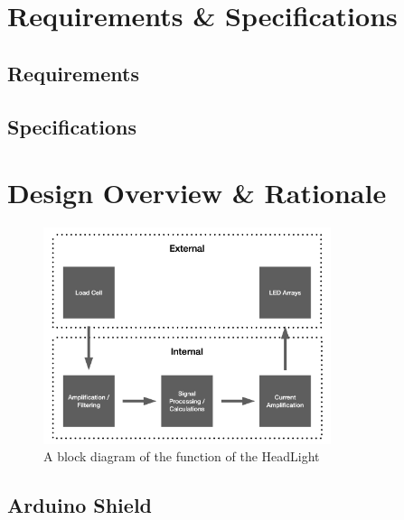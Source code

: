 \documentclass[twoside]{article}
\begin{document}
\section{Requirements \& Specifications}
    \subsection{Requirements}
    \subsection{Specifications}

\section{Design Overview \& Rationale}
    \noindent
    \begin{figure}[H]
        \centering
        \includegraphics[width=0.75\textwidth]{block_diagram.png}
        \caption{A block diagram of the function of the HeadLight}
        \label{fig:block}
    \end{figure}
    \subsection{Arduino Shield}
\end{document}
